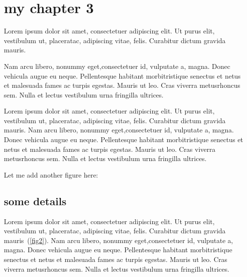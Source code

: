\section{my chapter 3}

Lorem ipsum dolor sit amet, consectetuer adipiscing elit.  Ut purus elit, vestibulum ut, placeratac,  adipiscing vitae,  felis.   Curabitur dictum gravida mauris.  

Nam arcu libero,  nonummy eget,consectetuer id, vulputate a, magna. Donec vehicula augue eu neque. Pellentesque habitant morbitristique senectus et netus et malesuada fames ac turpis egestas. Mauris ut leo. Cras viverra metusrhoncus sem.  Nulla et lectus vestibulum urna fringilla ultrices. \textcite{zuo2017state}

Lorem ipsum dolor sit amet, consectetuer adipiscing elit.  Ut purus elit, vestibulum ut, placeratac,  adipiscing vitae,  felis.   Curabitur dictum gravida mauris.  
Nam arcu libero,  nonummy eget,consectetuer id, vulputate a, magna. Donec vehicula augue eu neque. Pellentesque habitant morbitristique senectus et netus et malesuada fames ac turpis egestas. Mauris ut leo. Cras viverra metusrhoncus sem.  Nulla et lectus vestibulum urna fringilla ultrices. 

Let me add another figure here:
\begin{center}
\end{center}

\subsection{some details}

Lorem ipsum dolor sit amet, consectetuer adipiscing elit.  Ut purus elit, vestibulum ut, placeratac,  adipiscing vitae,  felis.   Curabitur dictum gravida mauris~(\cref{fig2}).  
Nam arcu libero,  nonummy eget,consectetuer id, vulputate a, magna. Donec vehicula augue eu neque. Pellentesque habitant morbitristique senectus et netus et malesuada fames ac turpis egestas. Mauris ut leo. Cras viverra metusrhoncus sem.  Nulla et lectus vestibulum urna fringilla ultrices. 
